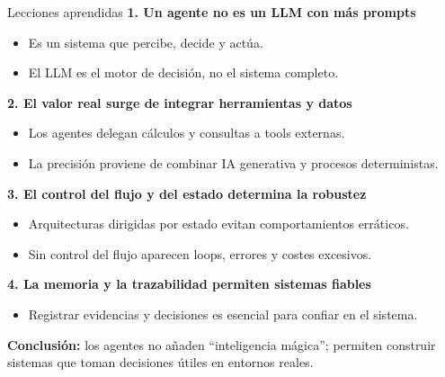 \documentclass[aspectratio=169]{beamer}
\begin{document}
\begin{frame}{Lecciones aprendidas}
\textbf{1. Un agente no es un LLM con más prompts}
\begin{itemize}
    \item Es un sistema que percibe, decide y actúa.
    \item El LLM es el motor de decisión, no el sistema completo.
\end{itemize}

\vspace{0.4em}

\textbf{2. El valor real surge de integrar herramientas y datos}
\begin{itemize}
    \item Los agentes delegan cálculos y consultas a tools externas.
    \item La precisión proviene de combinar IA generativa y procesos deterministas.
\end{itemize}

\vspace{0.4em}

\textbf{3. El control del flujo y del estado determina la robustez}
\begin{itemize}
    \item Arquitecturas dirigidas por estado evitan comportamientos erráticos.
    \item Sin control del flujo aparecen loops, errores y costes excesivos.
\end{itemize}

\vspace{0.4em}

\textbf{4. La memoria y la trazabilidad permiten sistemas fiables}
\begin{itemize}
    \item Registrar evidencias y decisiones es esencial para confiar en el sistema.
\end{itemize}

\vspace{0.6em}

\textbf{Conclusión:} los agentes no añaden “inteligencia mágica”;  
permiten construir sistemas que toman decisiones útiles en entornos reales.
\end{frame}
\end{document}
